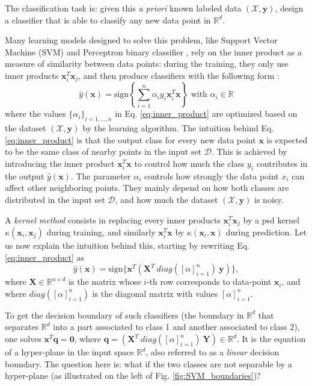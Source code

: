 The classification task is: given this \emph{a priori} known labeled data $(\mathcal{X},\mathbf{y})$, design a classifier that is able to classify any new data point in $\mathbb{R}^d$. 

Many learning models designed to solve this problem, like Support Vector Machine (SVM)  and Perceptron binary classifier , rely on the inner product as a measure of similarity between data points: during the training, they only use inner products $\mathbf{x}_i^T \mathbf{x}_j$, and then produce classifiers with the following form \citep{inner_product}:
\begin{equation}
\label{eq:inner_product}
\hat{y}(\mathbf{x})=\text{sign}\left\{\sum_{i=1}^n\alpha_iy_i\mathbf{x}_i^T\mathbf{x}\right\} \text{ with } \alpha_i\in \mathbb{R}
\end{equation}
where the values $\{\alpha_i\}_{i=1,\ldots,n}$ in Eq. \ref{eq:inner_product} are optimized based on the dataset $(\mathcal{X},\mathbf{y})$ by the learning algorithm. The intuition behind Eq. \ref{eq:inner_product} is that the output class for every new data point $\mathbf{x}$ is expected to be the same class of nearby points in the input set $\mathcal{D}$. This is achieved by introducing the inner product $\mathbf{x}_i^T\mathbf{x}$ to control how much the class $y_i$ contributes in the output $\hat{y}(\mathbf{x})$. The parameter $\alpha_i$ controls how strongly the data point $x_i$ can affect other neighboring points. They mainly depend on how both classes are distributed in the input set $\mathcal{D}$, and  how much the dataset $(\mathcal{X},\mathbf{y})$ is noisy. 



A \emph{kernel method} consists in replacing every inner products $\mathbf{x}_i^T \mathbf{x}_j$ by a psd kernel $\kappa(\mathbf{x}_i, \mathbf{x}_j)$ during training, and similarly $\mathbf{x}_i^T\mathbf{x}$ by $\kappa(\mathbf{x}_i, \mathbf{x})$ during prediction.
Let us now explain the intuition behind this, starting by rewriting Eq. \ref{eq:inner_product} as 
\[
\hat{y}(\mathbf{x})=\text{sign}\{\textbf{x}^T(\mathbf{X}^T~diag([\alpha]_{i=1}^n)~\mathbf{y})\},
\]
where $\mathbf{X}\in\mathbb{R}^{n\times d}$ is the matrix whose $i$-th row corresponds to data-point $\mathbf{x}_i$, and where $diag([\alpha]_{i=1}^n)$ is the diagonal matrix with values $[\alpha]_{i=1}^n$. 

To get the decision boundary of such classifiers (the boundary in $\mathbb{R}^d$ that separates $\mathbb{R}^d$ into a part associated to class 1 and another associated to class $2$), one solves $\mathbf{x}^T\mathbf{q}=\mathbf{0}$, where $\textbf{q}=(\mathbf{X}^T~diag([\alpha]_{i=1}^n)~\mathbf{Y})\in\mathbb{R}^d$. It is the equation of a hyper-plane in the input space $\mathbb{R}^d$, also referred to as a \emph{linear} decision boundary. 
The question here is: what if the two classes are not separable by a hyper-plane (as illustrated on the left of Fig. \ref{fig:SVM_boundaries})? 

